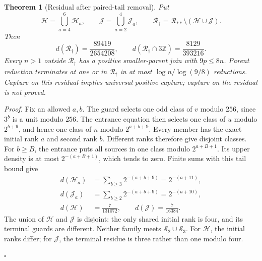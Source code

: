 \documentclass[11pt,letterpaper]{article}
\newcommand{\Z}{\mathbb{Z}}
\newtheorem{theorem}{Theorem}
\newenvironment{proof}{\noindent\textit{Proof.}}{\hfill\(\square\)}
\begin{document}
\begin{theorem}[Residual after paired-tail removal]
Put
\[
\mathcal H=\bigcup_{a=4}^6\mathcal H_a,\qquad
\mathcal J=\bigcup_{a=2}^4\mathcal J_a,\qquad
\mathcal R_{\dagger}=\mathcal R_{**}\setminus(\mathcal H\cup\mathcal J).
\]
Then
\[
d(\mathcal R_{\dagger})=\frac{89419}{2654208},\qquad
 d(\mathcal R_{\dagger}\cap3\Z)=\frac{8129}{393216}.
\]
Every \(n>1\) outside \(\mathcal R_{\dagger}\) has a positive
smaller-parent join with \(9p\le8n\). Parent reduction terminates at
one or in \(\mathcal R_{\dagger}\) in at most
\(\log n/\log(9/8)\) reductions. Capture on this residual implies
universal positive capture; capture on the residual is not proved.
\end{theorem}
\begin{proof}
Fix an allowed \(a,b\). The guard selects one odd class of \(v\)
modulo \(256\), since \(3^b\) is a unit modulo \(256\).
The entrance equation then selects one class of \(u\) modulo
\(2^{b+9}\), and hence one class of \(n\) modulo \(2^{a+b+9}\).
Every member has the exact initial rank \(a\) and second rank \(b\).
Different ranks therefore give disjoint classes.
For \(b\ge B\), the entrance puts all sources in one class modulo
\(2^{a+B+1}\). Its upper density is at most \(2^{-(a+B+1)}\),
which tends to zero. Finite sums with this tail bound give
\[
\begin{aligned}
d(\mathcal H_a)&=\sum_{b\ge3}2^{-(a+b+9)}=2^{-(a+11)},\\
d(\mathcal J_a)&=\sum_{b\ge2}2^{-(a+b+9)}=2^{-(a+10)},\\
d(\mathcal H)&=\frac7{131072},\qquad d(\mathcal J)=\frac7{16384}.
\end{aligned}
\]
The union of \(\mathcal H\) and \(\mathcal J\) is disjoint: the only
shared initial rank is four, and its terminal guards are different.
Neither family meets \(\mathcal S_2\cup\mathcal S_3\).
For \(\mathcal H\), the initial ranks differ; for \(\mathcal J\),
the terminal residue is three rather than one modulo four.


\end{proof}
\end{document}
